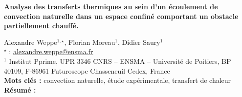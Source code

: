 


    \newpage


%
\begin{flushleft}
\addtocounter{section}{1}
{\Large \textbf{Analyse des transferts thermiques au sein d'un écoulement de convection naturelle  dans un espace confiné comportant un obstacle partiellement chauffé.}}\label{ref:48}
\end{flushleft}
%
Alexandre Weppe$^{1,\star}$, Florian Moreau$^{1}$, Didier Saury$^{1}$\\[2mm]
$^{\star}$ \Letter : \url{alexandre.weppe@ensma.fr}\\[2mm]
{\footnotesize $^{1}$ Institut Pprime, UPR 3346 CNRS – ENSMA – Université de Poitiers, BP 40109, F-86961 Futuroscope Chasseneuil Cedex, France}\\
[4mm]
%
\noindent \textbf{Mots clés : } convection naturelle, étude expérimentale, transfert de chaleur\\[4mm]
%
\noindent \textbf{Résumé : } 

